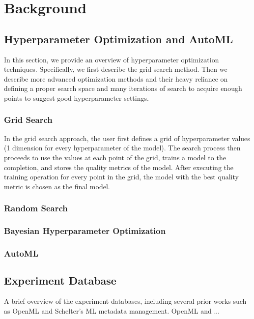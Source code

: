 \section{Background} \label{sec-background}

\subsection{Hyperparameter Optimization and AutoML}\label{background-hyperparameter-optimization}
In this section, we provide an overview of hyperparameter optimization techniques. 
Specifically, we first describe the grid search method.
Then we describe more advanced optimization methods and their heavy reliance on defining a proper search space and many iterations of search to acquire enough points to suggest good hyperparameter settings.
\subsubsection{Grid Search}
In the grid search approach, the user first defines a grid of hyperparameter values (1 dimension for every hyperparameter of the model).
The search process then proceeds to use the values at each point of the grid, trains a model to the completion, and stores the quality metrics of the model.
After executing the training operation for every point in the grid, the model with the best quality metric is chosen as the final model.
\subsubsection{Random Search}
\subsubsection{Bayesian Hyperparameter Optimization}
\subsubsection{AutoML}

\subsection{Experiment Database}
A brief overview of the experiment databases, including several prior works such as OpenML and Schelter's  ML metadata management.
OpenML and ...

%

